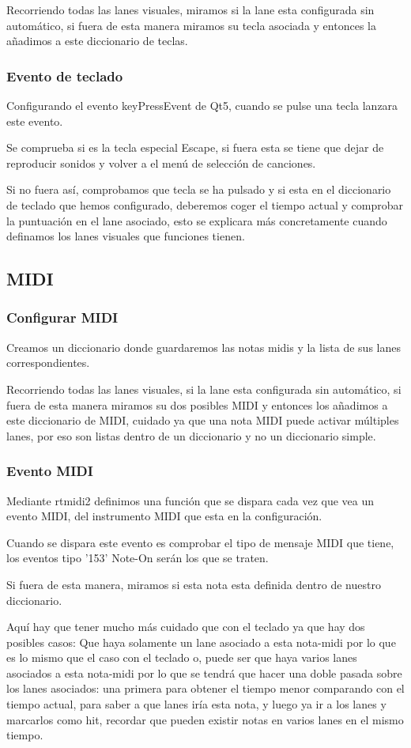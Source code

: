 \documentclass[a4paper,11pt,oneside]{book}
\begin{document}
Recorriendo todas las lanes visuales, miramos si la lane esta configurada sin automático, si fuera de esta manera miramos su tecla asociada y entonces la añadimos a este diccionario de teclas. 

\subsubsection{Evento de teclado}
Configurando el evento keyPressEvent de Qt5, cuando se pulse una tecla lanzara este evento.

Se comprueba si es la tecla especial Escape, si fuera esta se tiene que dejar de reproducir sonidos y volver a el menú de selección de canciones.

Si no fuera así, comprobamos que tecla se ha pulsado y si esta en el diccionario de teclado que hemos configurado, deberemos coger el tiempo actual y comprobar la puntuación en el lane asociado, esto se explicara más concretamente cuando definamos los lanes visuales que funciones tienen.

\subsection{MIDI}
\subsubsection{Configurar MIDI}
Creamos un diccionario donde guardaremos las notas midis y la lista de sus lanes correspondientes.

Recorriendo todas las lanes visuales, si la lane esta configurada sin automático, si fuera de esta manera miramos su dos posibles MIDI y entonces los añadimos a este diccionario de MIDI, cuidado ya que una nota MIDI puede activar múltiples lanes, por eso son listas dentro de un diccionario y no un diccionario simple.
\subsubsection{Evento MIDI}
Mediante rtmidi2 definimos una función que se dispara cada vez que vea un evento MIDI, del instrumento MIDI que esta en la configuración.

Cuando se dispara este evento es comprobar el tipo de mensaje MIDI que tiene, los eventos tipo '153' Note-On serán los que se traten.

Si fuera de esta manera, miramos si esta nota esta definida dentro de nuestro diccionario.

Aquí hay que tener mucho más cuidado que con el teclado ya que hay dos posibles casos:
Que haya solamente un lane asociado a esta nota-midi por lo que es lo mismo que el caso con el teclado o, puede ser que haya varios lanes asociados a esta nota-midi por lo que se tendrá que hacer una doble pasada sobre los lanes asociados: una primera para obtener el tiempo menor comparando con el tiempo actual, para saber a que lanes iría esta nota, y luego ya ir a los lanes y marcarlos como hit, recordar que pueden existir notas en varios lanes en el mismo tiempo. 
\end{document}
